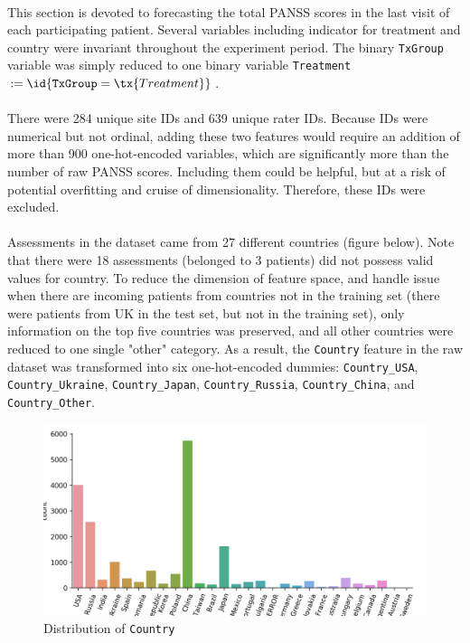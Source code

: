 \documentclass[11pt]{article}
\begin{document}
	\paragraph{} This section is devoted to forecasting the total PANSS scores in the last visit of each participating patient. Several variables including indicator for treatment and country were invariant throughout the experiment period. The binary \texttt{TxGroup} variable was simply reduced to one binary variable \texttt{Treatment} $:= \id{\texttt{TxGroup} = \tx{Treatment}}$.
	
	\paragraph{} There were 284 unique site IDs and 639 unique rater IDs. Because IDs were numerical but not ordinal, adding these two features would require an addition of more than 900 one-hot-encoded variables, which are significantly more than the number of raw PANSS scores. Including them could be helpful, but at a risk of potential overfitting and cruise of dimensionality. Therefore, these IDs were excluded.
	\paragraph{} Assessments in the dataset came from 27 different countries (figure below). Note that there were 18 assessments (belonged to 3 patients) did not possess valid values for country. To reduce the dimension of feature space, and handle issue when there are incoming patients from countries not in the training set (there were patients from UK in the test set, but not in the training set), only information on the top five countries was preserved, and all other countries were reduced to one single "other" category. As a result, the \texttt{Country} feature in the raw dataset was transformed into six one-hot-encoded dummies: \texttt{Country\_USA}, \texttt{Country\_Ukraine}, \texttt{Country\_Japan}, \texttt{Country\_Russia}, \texttt{Country\_China}, and \texttt{Country\_Other}.
	\begin{figure}[H]
		\centering
		\includegraphics[width=0.7\linewidth]{figures/dist_country.png}
		\caption{Distribution of \texttt{Country}}
	\end{figure}
	
\end{document}
